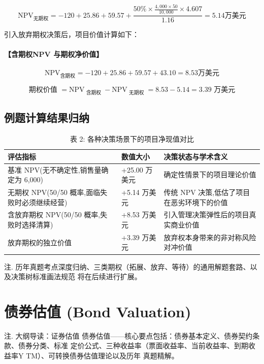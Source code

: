 \documentclass[lang=cn,10pt,color=blue]{elegantbook}
\begin{document}
$$
\mathrm{NPV} _ {\text {无期权}} = - 120 + 25.86 + 59.57 + \frac {50 \% \times \frac {4,000 \times 50}{10,000} \times 4.607}{1.16} = 5.14 \text {万美元}
$$

引入放弃期权决策后，项目价值计算如下： 

\subsubsection{【含期权NPV 与期权净价值】}

$$
\mathrm{NPV} _ {\text {含期权}} = - 1 2 0 + 2 5. 8 6 + 5 9. 5 7 + 4 3. 1 0 = 8. 5 3 \text {万美元}
$$

$$
\text { 期权价值 } = \mathrm{NPV} _ {\text { 含期权 }} - \mathrm{NPV} _ {\text { 无期权 }} = 8. 5 3 - 5. 1 4 = 3. 3 9 \text {   万美元   }
$$

\section{例题计算结果归纳}

\begin{table}[ht]
  \centering
  \caption{表 2: 各种决策场景下的项目净现值对比}
  \renewcommand{\arraystretch}{1.4}
\begin{tabularx}{\textwidth}{lYY}
  \toprule
  评估指标 & 数值大小 & 决策状态与学术含义 \\
  \midrule
  基准 NPV(无不确定性,销售量确定为 6,000) & +25.00 万美元 & 确定性情景下的项目理论价值 \\
  无期权 NPV(50/50 概率,面临失败时必须继续经营) & +5.14 万美元 & 传统 NPV 决策,低估了项目在恶劣环境下的价值 \\
  含放弃期权 NPV(50/50 概率,失败时选择清算) & +8.53 万美元 & 引入管理决策弹性后的项目真实商业价值 \\
  放弃期权的独立价值 & +3.39 万美元 & 放弃权本身带来的非对称风险对冲价值 \\
  \bottomrule
\end{tabularx}
\end{table}

注. 历年真题考点深度归纳、三类期权（拓展、放弃、等待）的通用解题套路、以及决策树标准画法规范 将在后续进行扩展。 

\chapter{债券估值 (Bond Valuation)}

注. 大纲导读：证券估值 债券估值——核心要点包括：债券基本定义、债券契约条款、债券分类、标准 定价公式、三种收益率（票面收益率、当前收益率、到期收益率Y TM）、可转换债券估值理论以及历年 真题精解。 
\end{document}
